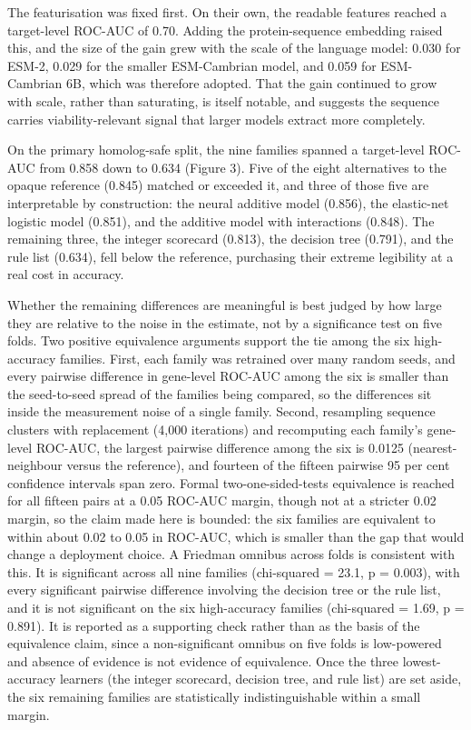 \documentclass[11pt,twocolumn]{article}
\begin{document}
The featurisation was fixed first. On their own, the readable features reached a target-level ROC-AUC of 0.70. Adding the protein-sequence embedding raised this, and the size of the gain grew with the scale of the language model: 0.030 for ESM-2, 0.029 for the smaller ESM-Cambrian model, and 0.059 for ESM-Cambrian 6B, which was therefore adopted. That the gain continued to grow with scale, rather than saturating, is itself notable, and suggests the sequence carries viability-relevant signal that larger models extract more completely.

On the primary homolog-safe split, the nine families spanned a target-level ROC-AUC from 0.858 down to 0.634 (Figure 3). Five of the eight alternatives to the opaque reference (0.845) matched or exceeded it, and three of those five are interpretable by construction: the neural additive model (0.856), the elastic-net logistic model (0.851), and the additive model with interactions (0.848). The remaining three, the integer scorecard (0.813), the decision tree (0.791), and the rule list (0.634), fell below the reference, purchasing their extreme legibility at a real cost in accuracy.

Whether the remaining differences are meaningful is best judged by how large they are relative to the noise in the estimate, not by a significance test on five folds. Two positive equivalence arguments support the tie among the six high-accuracy families. First, each family was retrained over many random seeds, and every pairwise difference in gene-level ROC-AUC among the six is smaller than the seed-to-seed spread of the families being compared, so the differences sit inside the measurement noise of a single family. Second, resampling sequence clusters with replacement (4,000 iterations) and recomputing each family's gene-level ROC-AUC, the largest pairwise difference among the six is 0.0125 (nearest-neighbour versus the reference), and fourteen of the fifteen pairwise 95 per cent confidence intervals span zero. Formal two-one-sided-tests equivalence is reached for all fifteen pairs at a 0.05 ROC-AUC margin, though not at a stricter 0.02 margin, so the claim made here is bounded: the six families are equivalent to within about 0.02 to 0.05 in ROC-AUC, which is smaller than the gap that would change a deployment choice. A Friedman omnibus across folds is consistent with this. It is significant across all nine families (chi-squared = 23.1, p = 0.003), with every significant pairwise difference involving the decision tree or the rule list, and it is not significant on the six high-accuracy families (chi-squared = 1.69, p = 0.891). It is reported as a supporting check rather than as the basis of the equivalence claim, since a non-significant omnibus on five folds is low-powered and absence of evidence is not evidence of equivalence. Once the three lowest-accuracy learners (the integer scorecard, decision tree, and rule list) are set aside, the six remaining families are statistically indistinguishable within a small margin.
\end{document}
